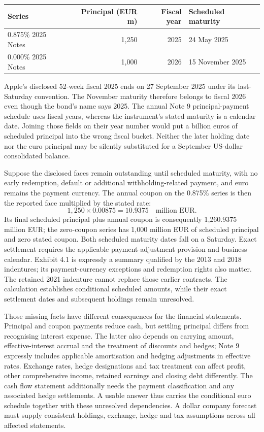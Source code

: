 \begin{center}
\begin{tabular}{lrrl}
\toprule
Series & Principal (EUR m) & Fiscal year & Scheduled maturity\\\midrule
0.875\% 2025 Notes &1,250&2025&24 May 2025\\
0.000\% 2025 Notes &1,000&2026&15 November 2025\\\bottomrule
\end{tabular}
\end{center}

Apple's disclosed 52-week fiscal 2025 ends on 27 September 2025 under its
last-Saturday convention. The November maturity therefore belongs to fiscal
2026 even though the bond's name says 2025. The annual Note 9 principal-payment
schedule uses fiscal years, whereas the instrument's stated maturity is a
calendar date. Joining those fields on their year number would put a billion
euros of scheduled principal into the wrong fiscal bucket. Neither the later
holding date nor the euro principal may be silently substituted for a
September US-dollar consolidated balance.

Suppose the disclosed faces remain outstanding until scheduled maturity, with
no early redemption, default or additional withholding-related payment, and
euro remains the payment currency. The annual coupon on the 0.875\% series is
then the reported face multiplied by the stated rate:
\[
       1{,}250\times0.00875=10.9375\quad\text{million EUR}.
\]
Its final scheduled principal plus annual coupon is consequently
1,260.9375 million EUR; the zero-coupon series has 1,000 million EUR of
scheduled principal and zero stated coupon. Both scheduled maturity dates
fall on a Saturday. Exact settlement requires the applicable payment-adjustment
provision and business calendar. Exhibit 4.1 is expressly a summary qualified
by the 2013 and 2018 indentures; its payment-currency exceptions and redemption
rights also matter. The retained 2021 indenture cannot replace those earlier
contracts. The calculation establishes conditional scheduled amounts, while
their exact settlement dates and subsequent holdings remain unresolved.

Those missing facts have different consequences for the financial statements.
Principal and coupon payments reduce cash, but settling principal differs from
recognising interest expense. The latter also depends on carrying amount,
effective-interest accrual and the treatment of discounts and hedges; Note 9
expressly includes applicable amortisation and hedging adjustments in effective
rates. Exchange rates, hedge designations and tax treatment can affect profit,
other comprehensive income, retained earnings and closing debt differently.
The cash flow statement additionally needs the payment classification and any
associated hedge settlements. A usable answer thus carries the conditional
euro schedule together with these unresolved dependencies. A dollar company
forecast must supply consistent holdings, exchange, hedge and tax assumptions
across all affected statements.

